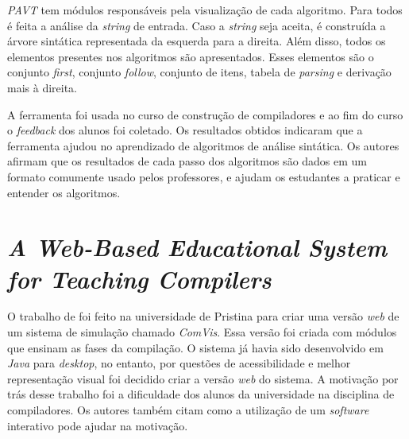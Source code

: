 \textit{PAVT} tem módulos responsáveis pela visualização de cada algoritmo. Para todos é feita a análise da \textit{string} de entrada. Caso a \textit{string} seja aceita, é construída a árvore sintática representada da esquerda para a direita. Além disso, todos os elementos presentes nos algoritmos são apresentados. Esses elementos são o conjunto \textit{first}, conjunto \textit{follow}, conjunto de itens, tabela de \textit{parsing} e derivação mais à direita.

A ferramenta foi usada no curso de construção de compiladores e ao fim do curso o \textit{feedback} dos alunos foi coletado. Os resultados obtidos indicaram que a ferramenta ajudou no aprendizado de algoritmos de análise sintática. Os autores afirmam que os resultados de cada passo dos algoritmos são dados em um formato comumente usado pelos professores, e ajudam os estudantes a praticar e entender os algoritmos.



\section{\textit{A Web-Based Educational System for Teaching Compilers}}
O trabalho de \textcite{webbased} foi feito na universidade de Pristina para criar uma versão \textit{web} de um sistema de simulação chamado \textit{ComVis}. Essa versão foi criada com módulos que ensinam as fases da compilação. O sistema já havia sido desenvolvido em \textit{Java} para \textit{desktop}, no entanto, por questões de acessibilidade e melhor representação visual foi decidido criar a versão \textit{web} do sistema. A motivação por trás desse trabalho foi a dificuldade dos alunos da universidade na disciplina de compiladores. Os autores também citam como a utilização de um \textit{software} interativo pode ajudar na motivação.

